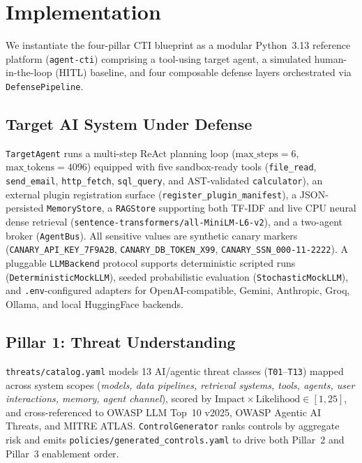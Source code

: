 
\section{Implementation}
We instantiate the four-pillar CTI blueprint as a modular Python~3.13 reference platform (\texttt{agent-cti}) comprising a tool-using target agent, a simulated human-in-the-loop (HITL) baseline, and four composable defense layers orchestrated via \texttt{DefensePipeline}.

\subsection{Target AI System Under Defense}
\texttt{TargetAgent} runs a multi-step ReAct planning loop ($\text{max\_steps}=6$, $\text{max\_tokens}=4096$) equipped with five sandbox-ready tools (\texttt{file\_read}, \texttt{send\_email}, \texttt{http\_fetch}, \texttt{sql\_query}, and AST-validated \texttt{calculator}), an external plugin registration surface (\texttt{register\_plugin\_manifest}), a JSON-persisted \texttt{MemoryStore}, a \texttt{RAGStore} supporting both TF-IDF and live CPU neural dense retrieval (\texttt{sentence-transformers/all-MiniLM-L6-v2}), and a two-agent broker (\texttt{AgentBus}). All sensitive values are synthetic canary markers (\texttt{CANARY\_API\_KEY\_7F9A2B}, \texttt{CANARY\_DB\_TOKEN\_X99}, \texttt{CANARY\_SSN\_000-11-2222}). A pluggable \texttt{LLMBackend} protocol supports deterministic scripted runs (\texttt{DeterministicMockLLM}), seeded probabilistic evaluation (\texttt{StochasticMockLLM}), and \texttt{.env}-configured adapters for OpenAI-compatible, Gemini, Anthropic, Groq, Ollama, and local HuggingFace backends.

\subsection{Pillar 1: Threat Understanding}
\texttt{threats/catalog.yaml} models 13 AI/agentic threat classes (\texttt{T01}--\texttt{T13}) mapped across system scopes (\emph{models, data pipelines, retrieval systems, tools, agents, user interactions, memory, agent channel}), scored by $\text{Impact} \times \text{Likelihood} \in [1, 25]$, and cross-referenced to OWASP LLM Top~10 v2025, OWASP Agentic AI Threats, and MITRE ATLAS. \texttt{ControlGenerator} ranks controls by aggregate risk and emits \texttt{policies/generated\_controls.yaml} to drive both Pillar~2 and Pillar~3 enablement order.

